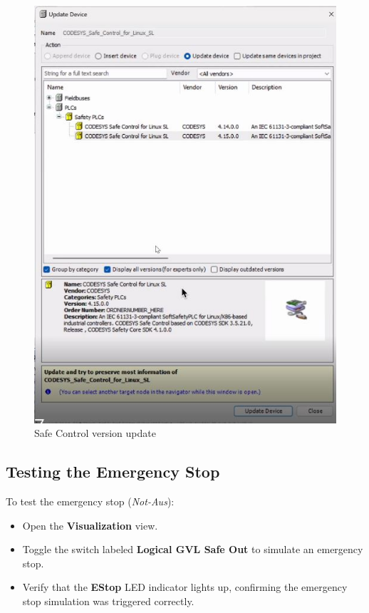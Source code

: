 \documentclass[a4paper,12pt]{article}
\begin{document}
\begin{figure}[H]
\begin{minipage}{0.4\textwidth}
		\includegraphics[width=\textwidth]{c5.jpg}
		\caption{Safe Control version update}
	\end{minipage}
\end{figure}

\subsection{Testing the Emergency Stop}

To test the emergency stop (\textit{Not-Aus}):
\begin{itemize}
	\item Open the \textbf{Visualization} view.
	\item Toggle the switch labeled \textbf{Logical GVL Safe Out} to simulate an emergency stop.
	\item Verify that the \textbf{EStop} LED indicator lights up, confirming the emergency stop simulation was triggered correctly.
\end{itemize}
\end{document}
